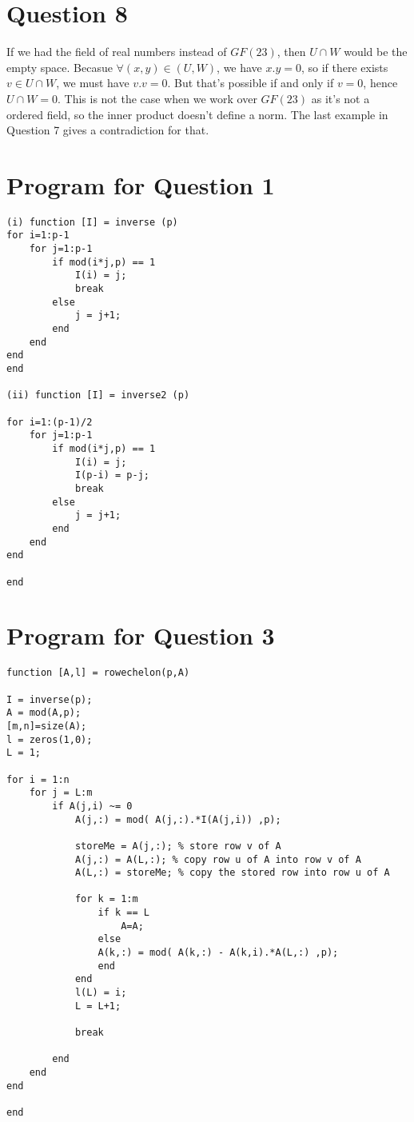 \documentclass[11pt]{article}
\begin{document}
\section*{Question 8}

If we had the field of real numbers instead of $GF(23)$, then $U\cap W$ would be the empty space. Becasue $\forall (x,y) \in (U,W)$, we have $x.y = 0$, so if there exists $v\in U\cap W$, we must have $v.v = 0$. But that's possible if and only if $v=0$, hence $U\cap W = 0$. This is not the case when we work over $GF(23)$ as it's not a ordered field, so the inner product doesn't define a norm. The last example in Question 7 gives a contradiction for that.




\newpage
\section*{Program for Question 1}
\label{sec:program1}
\begin{verbatim}
(i) function [I] = inverse (p)
for i=1:p-1
    for j=1:p-1
        if mod(i*j,p) == 1     
            I(i) = j;         
            break         
        else         
            j = j+1; 
        end
    end
end
end

(ii) function [I] = inverse2 (p)

for i=1:(p-1)/2
    for j=1:p-1
        if mod(i*j,p) == 1     
            I(i) = j;
            I(p-i) = p-j;
            break         
        else         
            j = j+1; 
        end
    end
end

end
\end{verbatim}







\newpage
\section*{Program for Question 3}
\label{sec:program3}
\begin{verbatim}
function [A,l] = rowechelon(p,A)

I = inverse(p);
A = mod(A,p);
[m,n]=size(A);
l = zeros(1,0);
L = 1;

for i = 1:n
    for j = L:m
        if A(j,i) ~= 0
            A(j,:) = mod( A(j,:).*I(A(j,i)) ,p); 
            
            storeMe = A(j,:); % store row v of A
            A(j,:) = A(L,:); % copy row u of A into row v of A
            A(L,:) = storeMe; % copy the stored row into row u of A
            
            for k = 1:m 
                if k == L
                    A=A;
                else
                A(k,:) = mod( A(k,:) - A(k,i).*A(L,:) ,p);
                end
            end
            l(L) = i;
            L = L+1;
            
            break
           
        end
    end
end

end
\end{verbatim} 
\end{document}
